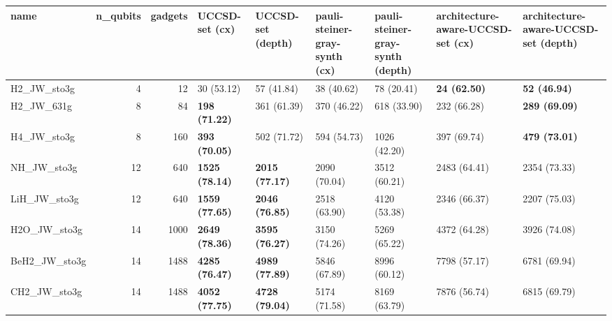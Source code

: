 \begin{tabular}{lrrllllll}
\toprule
name & n\_qubits & gadgets & UCCSD-set (cx) & UCCSD-set (depth) & pauli-steiner-gray-synth (cx) & pauli-steiner-gray-synth (depth) & architecture-aware-UCCSD-set (cx) & architecture-aware-UCCSD-set (depth) \\
\midrule
H2\_JW\_sto3g & 4 & 12 & 30 (53.12) & 57 (41.84) & 38 (40.62) & 78 (20.41) & \textbf{24 (62.50)} & \textbf{52 (46.94)} \\
H2\_JW\_631g & 8 & 84 & \textbf{198 (71.22)} & 361 (61.39) & 370 (46.22) & 618 (33.90) & 232 (66.28) & \textbf{289 (69.09)} \\
H4\_JW\_sto3g & 8 & 160 & \textbf{393 (70.05)} & 502 (71.72) & 594 (54.73) & 1026 (42.20) & 397 (69.74) & \textbf{479 (73.01)} \\
NH\_JW\_sto3g & 12 & 640 & \textbf{1525 (78.14)} & \textbf{2015 (77.17)} & 2090 (70.04) & 3512 (60.21) & 2483 (64.41) & 2354 (73.33) \\
LiH\_JW\_sto3g & 12 & 640 & \textbf{1559 (77.65)} & \textbf{2046 (76.85)} & 2518 (63.90) & 4120 (53.38) & 2346 (66.37) & 2207 (75.03) \\
H2O\_JW\_sto3g & 14 & 1000 & \textbf{2649 (78.36)} & \textbf{3595 (76.27)} & 3150 (74.26) & 5269 (65.22) & 4372 (64.28) & 3926 (74.08) \\
BeH2\_JW\_sto3g & 14 & 1488 & \textbf{4285 (76.47)} & \textbf{4989 (77.89)} & 5846 (67.89) & 8996 (60.12) & 7798 (57.17) & 6781 (69.94) \\
CH2\_JW\_sto3g & 14 & 1488 & \textbf{4052 (77.75)} & \textbf{4728 (79.04)} & 5174 (71.58) & 8169 (63.79) & 7876 (56.74) & 6815 (69.79) \\
\bottomrule
\end{tabular}
